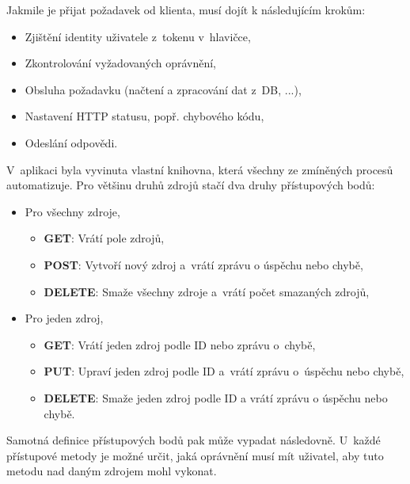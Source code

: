 \documentclass[a4paper,12pt]{article}
\begin{document}
Jakmile je přijat požadavek od klienta, musí dojít k následujícím krokům:

\begin{itemize}
\item Zjištění identity uživatele z~tokenu v~hlavičce,
\item Zkontrolování vyžadovaných oprávnění,
\item Obsluha požadavku (načtení a zpracování dat z~DB, ...),
\item Nastavení HTTP statusu, popř. chybového kódu,
\item Odeslání odpovědi.
\end{itemize}

V~aplikaci byla vyvinuta vlastní knihovna, která všechny ze zmíněných procesů automatizuje. Pro většinu druhů zdrojů stačí dva druhy přístupových bodů:

\begin{itemize}
\item Pro všechny zdroje,

\begin{itemize}
\item \textbf{GET}: Vrátí pole zdrojů,
\item \textbf{POST}: Vytvoří nový zdroj a~vrátí zprávu o úspěchu nebo chybě,
\item \textbf{DELETE}: Smaže všechny zdroje a~vrátí počet smazaných zdrojů,
\end{itemize}

\item Pro jeden zdroj,

\begin{itemize}
\item \textbf{GET}: Vrátí jeden zdroj podle ID nebo zprávu o~chybě,
\item \textbf{PUT}: Upraví jeden zdroj podle ID a~vrátí zprávu o~úspěchu nebo chybě,
\item \textbf{DELETE}: Smaže jeden zdroj podle ID a vrátí zprávu o úspěchu nebo chybě.
\end{itemize}

\end{itemize}

Samotná definice přístupových bodů pak může vypadat následovně. U~každé přístupové metody je možné určit, jaká oprávnění musí mít uživatel, aby tuto metodu nad daným zdrojem mohl vykonat.


\end{document}
